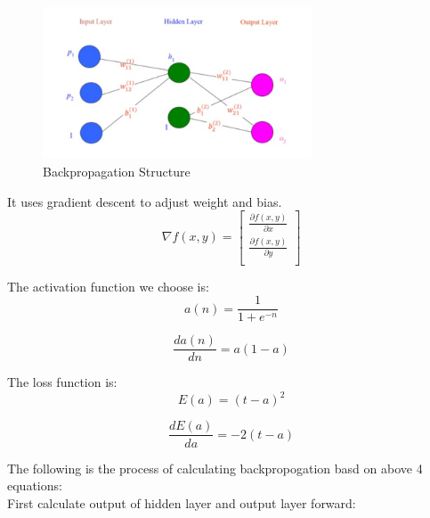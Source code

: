 \documentclass[conference]{IEEEtran}
\begin{document}
\begin{figure}[htbp]
\centerline{\includegraphics[width=8cm]{Backpropagation.png}}
\caption{Backpropagation Structure}
\label{fig}
\end{figure}

It uses gradient descent to adjust weight and bias.\\

\begin{equation}
\label{gradient_descent}
\nabla f(x, y) = \left[
\begin{array}{ccc}
\frac{\partial f(x, y)}{\partial x}\\
\frac{\partial f(x, y)}{\partial y}\\
\end{array}
\right]
\end{equation}

The activation function we choose is:\\

\begin{equation}
\label{activation_function}
a(n)=\frac{1}{1+e^{-n}}
\end{equation}

\begin{equation}
\label{activation_function_2}
\frac{da(n)}{dn}=a(1-a)
\end{equation}
	
The loss function is:\\

\begin{equation}
\label{loss_function}
E(a)=(t-a)^2
\end{equation}

\begin{equation}
\label{loss_function_2}
\frac{dE(a)}{da}=-2(t-a)
\end{equation}

The following is the process of calculating backpropogation basd on above 4 equations:\\

First calculate output of hidden layer and output layer forward:\\
\end{document}
